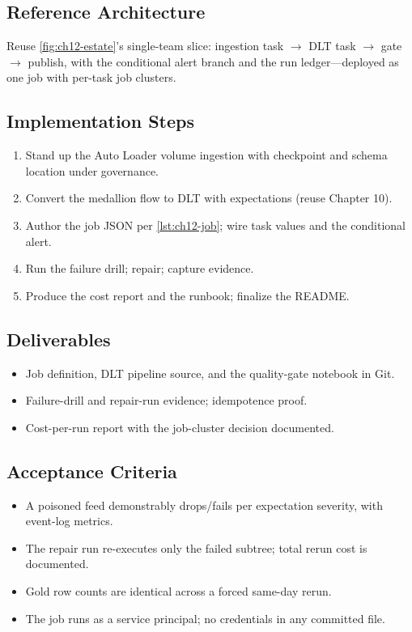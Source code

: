 \subsection*{Reference Architecture}
Reuse \cref{fig:ch12-estate}'s single-team slice: ingestion task $\rightarrow$ DLT task $\rightarrow$ gate $\rightarrow$ publish, with the conditional alert branch and the run ledger---deployed as one job with per-task job clusters.

\subsection*{Implementation Steps}
\begin{enumerate}
    \item Stand up the Auto Loader volume ingestion with checkpoint and schema location under governance.
    \item Convert the medallion flow to DLT with expectations (reuse Chapter 10).
    \item Author the job JSON per \cref{lst:ch12-job}; wire task values and the conditional alert.
    \item Run the failure drill; repair; capture evidence.
    \item Produce the cost report and the runbook; finalize the README.
\end{enumerate}

\subsection*{Deliverables}
\begin{itemize}
    \item Job definition, DLT pipeline source, and the quality-gate notebook in Git.
    \item Failure-drill and repair-run evidence; idempotence proof.
    \item Cost-per-run report with the job-cluster decision documented.
\end{itemize}

\subsection*{Acceptance Criteria}
\begin{itemize}
    \item A poisoned feed demonstrably drops/fails per expectation severity, with event-log metrics.
    \item The repair run re-executes only the failed subtree; total rerun cost is documented.
    \item Gold row counts are identical across a forced same-day rerun.
    \item The job runs as a service principal; no credentials in any committed file.
\end{itemize}

